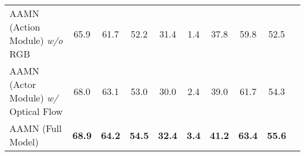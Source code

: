 \documentclass[journal]{IEEEtran}
\begin{document}
\begin{table*}[!tb]
\begin{threeparttable}
{\begin{tabular}{lccccccccc}
AAMN (Action Module) \emph{w/o} RGB             & 65.9	      & 61.7	  &52.2	     & 31.4     & 1.4      & 37.8	      &59.8	       &52.5 \\
AAMN (Actor Module) \emph{w/} Optical Flow      & 68.0	      & 63.1	  &53.0	     & 30.0     & 2.4      & 39.0	      &61.7	       &54.3 \\
AAMN (Full Model)                    & \textbf{68.9} &\textbf{64.2} &\textbf{54.5} &\textbf{32.4} &\textbf{3.4} &\textbf{41.2} &\textbf{63.4} &\textbf{55.6} \\
\bottomrule
\end{tabular}}
\end{threeparttable}
\end{table*}


\begin{table}[!tb]
\begin{threeparttable}
\caption{The Impact of Optical Flow on the Semantic Similarity}
\label{table:linking_scores}
\centering
{}
\end{threeparttable}
\vspace{-0.1cm}
\end{table}
\end{document}

